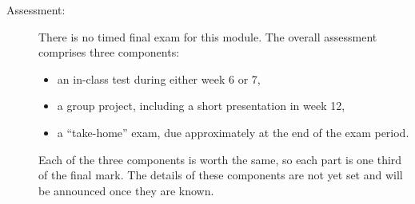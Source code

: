 \documentclass[a4paper, 12pt]{article}
\begin{document}
\begin{description}
    \item[Assessment:] There is no timed final exam for this module. The overall
    assessment comprises three components:
    \begin{itemize}
      \item an in-class test during either week 6 or 7,
      \item a group project, including a short presentation in week 12,
      \item a ``take-home'' exam, due approximately at the end of the exam period.
    \end{itemize}
    Each of the three components is worth the same, so each part is one third of
    the final mark. The details of these components are not yet set and will be
    announced once they are known.
\end{description}
\end{document}
